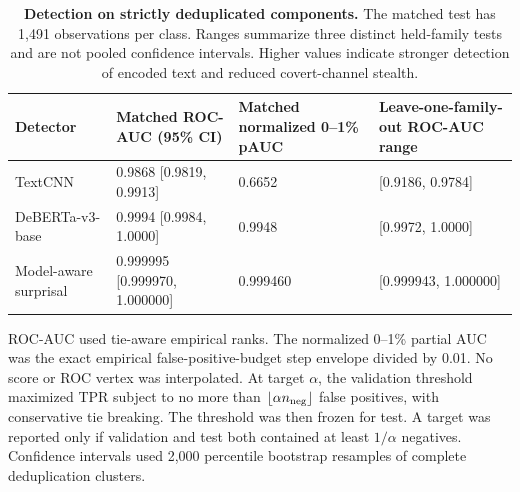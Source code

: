 \documentclass[fleqn,10pt]{wlscirep}
\begin{document}
\begin{table}[H]
\centering
\small
\setlength{\tabcolsep}{3pt}
\begin{tabularx}{\textwidth}{L{0.22\textwidth}L{0.20\textwidth}L{0.23\textwidth}Y}
\toprule
Detector & Matched ROC-AUC (95\% CI) & Matched normalized 0--1\% pAUC & Leave-one-family-out ROC-AUC range \\
\midrule
TextCNN & 0.9868 [0.9819, 0.9913] & 0.6652 & [0.9186, 0.9784] \\
DeBERTa-v3-base & 0.9994 [0.9984, 1.0000] & 0.9948 & [0.9972, 1.0000] \\
Model-aware surprisal & 0.999995 [0.999970, 1.000000] & 0.999460 & [0.999943, 1.000000] \\
\bottomrule
\end{tabularx}
\caption{\label{tab:v3-detector-main}\textbf{Detection on strictly deduplicated components.} The matched test has 1,491 observations per class. Ranges summarize three distinct held-family tests and are not pooled confidence intervals. Higher values indicate stronger detection of encoded text and reduced covert-channel stealth.}
\end{table}

ROC-AUC used tie-aware empirical ranks. The normalized 0--1\% partial AUC was the exact empirical false-positive-budget step envelope divided by 0.01. No score or ROC vertex was interpolated. At target \(\alpha\), the validation threshold maximized TPR subject to no more than \(\lfloor\alpha n_{\rm neg}\rfloor\) false positives, with conservative tie breaking. The threshold was then frozen for test. A target was reported only if validation and test both contained at least \(1/\alpha\) negatives. Confidence intervals used 2,000 percentile bootstrap resamples of complete deduplication clusters.
\end{document}

